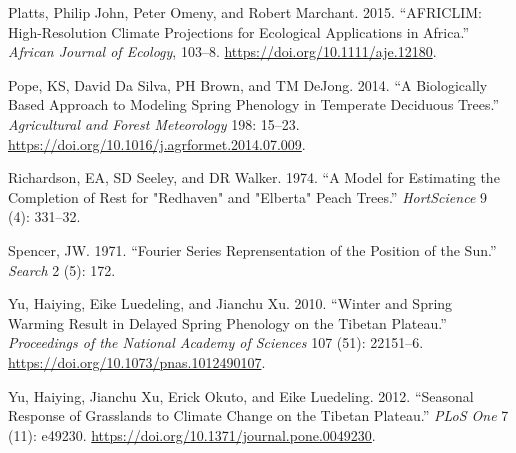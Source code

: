 \documentclass[
]{book}
\begin{document}
\leavevmode\hypertarget{ref-platts2015africlim}{}%
Platts, Philip John, Peter Omeny, and Robert Marchant. 2015. ``AFRICLIM: High-Resolution Climate Projections for Ecological Applications in Africa.'' \emph{African Journal of Ecology}, 103--8. \url{https://doi.org/10.1111/aje.12180}.

\leavevmode\hypertarget{ref-pope2014biologically}{}%
Pope, KS, David Da Silva, PH Brown, and TM DeJong. 2014. ``A Biologically Based Approach to Modeling Spring Phenology in Temperate Deciduous Trees.'' \emph{Agricultural and Forest Meteorology} 198: 15--23. \url{https://doi.org/10.1016/j.agrformet.2014.07.009}.

\leavevmode\hypertarget{ref-richardson1974model}{}%
Richardson, EA, SD Seeley, and DR Walker. 1974. ``A Model for Estimating the Completion of Rest for "Redhaven" and "Elberta" Peach Trees.'' \emph{HortScience} 9 (4): 331--32.

\leavevmode\hypertarget{ref-spencer1971fourier}{}%
Spencer, JW. 1971. ``Fourier Series Reprensentation of the Position of the Sun.'' \emph{Search} 2 (5): 172.

\leavevmode\hypertarget{ref-yu2010winter}{}%
Yu, Haiying, Eike Luedeling, and Jianchu Xu. 2010. ``Winter and Spring Warming Result in Delayed Spring Phenology on the Tibetan Plateau.'' \emph{Proceedings of the National Academy of Sciences} 107 (51): 22151--6. \url{https://doi.org/10.1073/pnas.1012490107}.

\leavevmode\hypertarget{ref-yu2012seasonal}{}%
Yu, Haiying, Jianchu Xu, Erick Okuto, and Eike Luedeling. 2012. ``Seasonal Response of Grasslands to Climate Change on the Tibetan Plateau.'' \emph{PLoS One} 7 (11): e49230. \url{https://doi.org/10.1371/journal.pone.0049230}.
\end{document}
